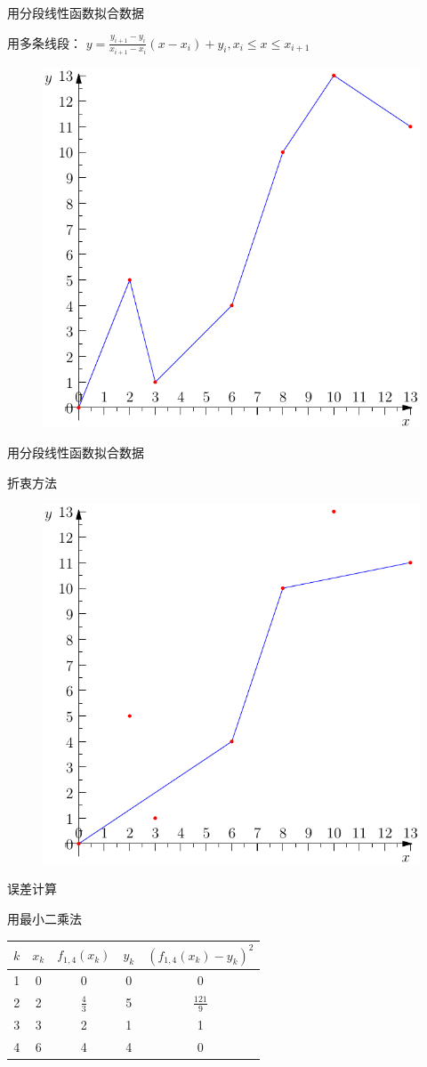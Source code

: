 \documentclass[UTF8]{ctexbeamer}
\begin{document}
\begin{frame}{用分段线性函数拟合数据}
  \begin{block}{}
    用多条线段： $y=\frac{y_{i+1}-y_i}{x_{i+1}-x_i}(x-x_i) + y_i, x_i \le x \le x_{i+1}$
  \end{block}
  \begin{figure}
    \centering
    \includegraphics[width=.5\textwidth]{mline.pdf}
  \end{figure}
\end{frame}

\begin{frame}{用分段线性函数拟合数据}
  \begin{block}{}
    折衷方法
  \end{block}
  \begin{figure}
    \centering
    \includegraphics[width=.5\textwidth]{xline.pdf}
  \end{figure}
\end{frame}

\begin{frame}{误差计算}
  \begin{block}{}
    用最小二乘法
  \end{block}
  \begin{table}
    \centering
    \begin{tabular}{c|c|c|c|c}
      \hline
      $k$ & $x_k$ & $f_{1,4}(x_k)$ & $y_k$ & $(f_{1,4}(x_k)-y_k)^2$ \\
      \hline
      1 & 0 & 0 & 0 & 0\\
      \hline
      2 & 2 & $\frac{4}{3}$ & 5 & $\frac{121}{9}$ \\
      \hline
      3 & 3 & 2 & 1 & 1\\
      \hline
      4 & 6 & 4 & 4 & 0\\
      \hline
    \end{tabular}
  \end{table}
\end{frame}
\end{document}
